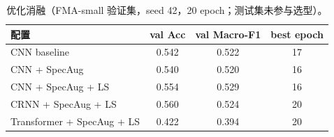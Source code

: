 \begin{table}[H]
\centering\small
\caption{优化消融（FMA-small 验证集，seed 42，20 epoch；测试集未参与选型）。}
\label{tab:ablation}
\begin{tabular}{lccc}
\toprule
配置 & val Acc & val Macro-F1 & best epoch\\
\midrule
CNN baseline & 0.542 & 0.522 & 17\\
CNN + SpecAug & 0.540 & 0.520 & 16\\
CNN + SpecAug + LS & 0.554 & 0.529 & 16\\
CRNN + SpecAug + LS & 0.560 & 0.524 & 20\\
Transformer + SpecAug + LS & 0.422 & 0.394 & 20\\
\bottomrule
\end{tabular}
\end{table}
